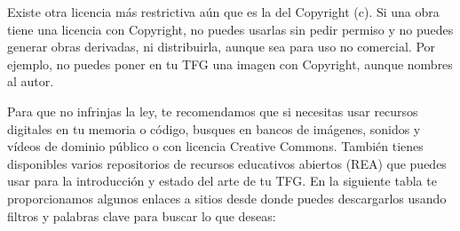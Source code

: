 Existe otra licencia más restrictiva aún que es la del Copyright (c). Si una obra tiene una licencia con Copyright, no puedes usarlas sin pedir permiso y no puedes generar obras derivadas, ni distribuirla, aunque sea para uso no comercial. Por ejemplo, no puedes poner en tu TFG una imagen con Copyright, aunque nombres al autor. 

Para que no infrinjas la ley, te recomendamos que si necesitas usar recursos digitales en tu memoria o código, busques en bancos de imágenes, sonidos y vídeos de dominio público o con licencia Creative Commons. También tienes disponibles varios repositorios de recursos educativos abiertos (REA) que puedes usar para la introducción y estado del arte de tu TFG. En la siguiente tabla te proporcionamos algunos enlaces a sitios desde donde puedes descargarlos usando filtros y palabras clave para buscar lo que deseas:

\begin{table}[t]
\begin{center}
\caption{Sitios con recursos digitales libres}
\end{center}
\end{table}



